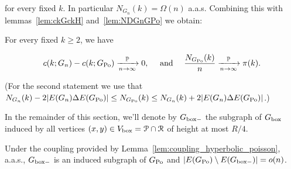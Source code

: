 \noindent
for every fixed $k$.
In particular $N_{G_n}(k) = \Omega(n)$ a.a.s. Combining this with lemmas~\ref{lem:ckGckH} and~\ref{lem:NDGnGPo} we obtain:

\begin{corollary}\label{cor:pok} 
For every fixed $k\geq 2$, we have

$$ c(k; G_n)-c(k; G_{{\mathrm{Po}}}) \xrightarrow[n\to\infty]{\mathbb{P}} 0, \quad\text{ and }\quad
\frac{N_{G_{{\mathrm{Po}}}}(k)}{n} \xrightarrow[n\to\infty]{\mathbb{P}} {\pi}(k). $$

\end{corollary}

\noindent
(For the second statement we use that $N_{G_n}(k) - 2|E(G_n)\Delta E(G_{{\mathrm{Po}}})| \leq N_{G_{{\mathrm{Po}}}}(k) \leq N_{G_n}(k) + 2|E(G_n)\Delta E(G_{{\mathrm{Po}}})|$.)

In the remainder of this section, we'll denote by $G_{\mathrm{box}-}$ the subgraph of $G_{\mathrm{box}}$ induced by all 
vertices $(x,y) \in V_{\text{box}} = {\mathcal P} \cap {\mathcal R}$ of height at most $R/4$.

\begin{lemma}
Under the coupling provided by Lemma~\ref{lem:coupling_hyperbolic_poisson}, a.a.s., 
$G_{\mathrm{box}-}$ is an induced subgraph of $G_{{\mathrm{Po}}}$ and $|E(G_{{\mathrm{Po}}}) \setminus E(G_{\mathrm{box}-})| = o(n)$.
\end{lemma}

